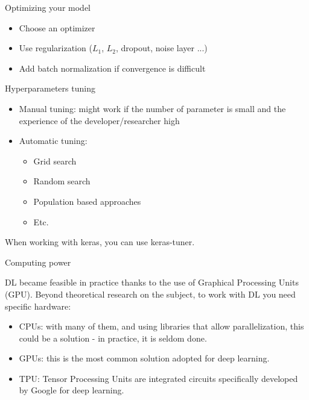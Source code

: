 \documentclass[xcolor=pdftex,dvipsnames,table,mathserif]{beamer}
\begin{document}
\begin{frame}{Optimizing your model}

  \begin{itemize}
  \item Choose an optimizer
  \item Use regularization ($L_1$, $L_2$, dropout, noise layer ...)
  \item Add batch normalization if convergence is difficult

  \end{itemize}

\end{frame}


\begin{frame}{Hyperparameters tuning}

  \begin{itemize}
  \item Manual tuning: might work if the number of parameter is small and the experience of the developer/researcher high
  \item Automatic tuning:
    \begin{itemize}
    \item Grid search
    \item Random search
    \item Population based approaches
    \item Etc.
    \end{itemize}
  \end{itemize}

  When working with keras, you can use keras-tuner.

\end{frame}

\begin{frame}{Computing power}

  DL became feasible in practice thanks to the use of Graphical Processing Units (GPU). Beyond theoretical research on the subject, to work with DL you need specific hardware:
  \begin{itemize}
  \item CPUs: with many of them, and using libraries that allow parallelization, this could be a solution - in practice, it is seldom done.
  \item GPUs: this is the most common solution adopted for deep learning.
  \item TPU: Tensor Processing Units are integrated circuits specifically developed by Google for deep learning.
  \end{itemize}

\end{frame}
\end{document}
